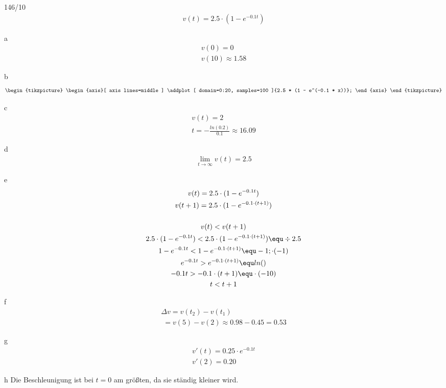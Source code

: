 \begin{exercise}{146/10}
  \begin{gather*}
    v(t) = 2.5 \cdot (1 - e^{-0.1t})
  \end{gather*}
  \item [a]
  \begin{gather*}
    v(0) = 0 \\
    v(10) \approx 1.58
  \end{gather*}
  \item [b]
  \begin{gather*}
    \begin{tikzpicture}
      \begin{axis}[
        axis lines=middle
        ]
        \addplot[
        domain=0:20,
        samples=100
        ]{2.5 * (1 - e^(-0.1 * x))};
      \end{axis}
    \end{tikzpicture}
  \end{gather*}
  \item [c]
  \begin{gather*}
    v(t) = 2 \\
    t = -\frac{ln(0.2)}{0.1} \approx 16.09
  \end{gather*}
  \item [d]
  \begin{gather*}
    \lim\limits_{t \to \infty} v(t) = 2.5
  \end{gather*}
  \item [e]
  \begin{gather*}
    v(t) = 2.5 \cdot (1 - e^{-0.1t}) \\
    v(t + 1) = 2.5 \cdot (1 - e^{-0.1 \cdot (t + 1)}) \\\\
    v(t) < v(t + 1) \\
    2.5 \cdot (1 - e^{-0.1t}) < 2.5 \cdot (1 - e^{-0.1 \cdot (t + 1)}) \equ \div 2.5 \\
    1 - e^{-0.1t} < 1 - e^{-0.1 \cdot (t + 1)} \equ - 1; \cdot (-1) \\
    e^{-0.1t} > e^{-0.1 \cdot (t + 1)} \equ ln() \\
    -0.1t > -0.1 \cdot (t + 1) \equ \cdot (-10) \\
    t < t + 1
  \end{gather*}
  \item [f]
  \begin{gather*}
    \Delta v = v(t_2) - v(t_1) \\
    \;= v(5) - v(2) \approx 0.98 - 0.45 = 0.53
  \end{gather*}
  \item [g]
  \begin{gather*}
    v'(t) = 0.25 \cdot e^{-0.1t} \\
    v'(2) = 0.20
  \end{gather*}
  \item [h]
  Die Beschleunigung ist bei $t = 0$ am größten, da sie ständig kleiner wird.
\end{exercise}
